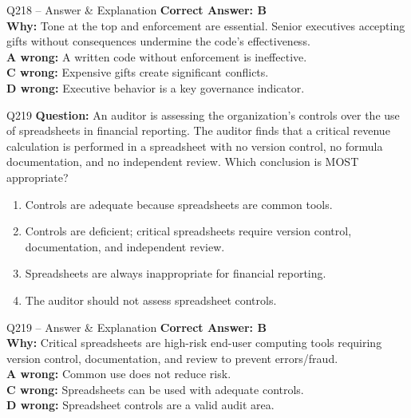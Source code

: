 \documentclass[aspectratio=169,10pt]{beamer}
\begin{document}
	\begin{frame}[t]{Q218 -- Answer \& Explanation}
		\small
		\textbf{Correct Answer: B} \\[4pt]
		\textbf{Why:} Tone at the top and enforcement are essential. Senior executives accepting gifts without consequences undermine the code's effectiveness. \\[4pt]
		\textbf{A wrong:} A written code without enforcement is ineffective. \\[2pt]
		\textbf{C wrong:} Expensive gifts create significant conflicts. \\[2pt]
		\textbf{D wrong:} Executive behavior is a key governance indicator.
	\end{frame}
	
	\begin{frame}[t]{Q219}
		\small
		\textbf{Question:} An auditor is assessing the organization's controls over the use of spreadsheets in financial reporting. The auditor finds that a critical revenue calculation is performed in a spreadsheet with no version control, no formula documentation, and no independent review. Which conclusion is MOST appropriate?
		\begin{enumerate}[label=\Alph*.,itemsep=1pt,topsep=2pt]
			\item Controls are adequate because spreadsheets are common tools.
			\item Controls are deficient; critical spreadsheets require version control, documentation, and independent review.
			\item Spreadsheets are always inappropriate for financial reporting.
			\item The auditor should not assess spreadsheet controls.
		\end{enumerate}
	\end{frame}
	
	\begin{frame}[t]{Q219 -- Answer \& Explanation}
		\small
		\textbf{Correct Answer: B} \\[4pt]
		\textbf{Why:} Critical spreadsheets are high-risk end-user computing tools requiring version control, documentation, and review to prevent errors/fraud. \\[4pt]
		\textbf{A wrong:} Common use does not reduce risk. \\[2pt]
		\textbf{C wrong:} Spreadsheets can be used with adequate controls. \\[2pt]
		\textbf{D wrong:} Spreadsheet controls are a valid audit area.
	\end{frame}
	
\end{document}
